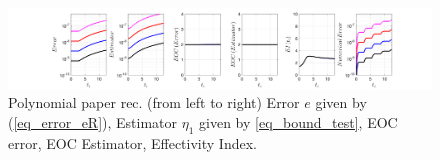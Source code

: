 \documentclass[12pt,a4paper]{article}
\numberwithin{equation}{section}
\theoremstyle{definition}
\begin{document}
\begin{figure}[H]
	\hspace{-3cm}
	\includegraphics[scale=0.55]{fig_LeapFrogplots_1x5_sin_IC_harmonic_u4_v6_paperrec_poly}	
	\caption{Polynomial paper rec. (from left to right) Error $e$ given by (\ref{eq_error_eR}), Estimator $\eta_1$ given by \ref{eq_bound_test},  EOC error, EOC Estimator, Effectivity Index.}
	\label{fig_all_in_one_paperrec_poly_u04_v06}
\end{figure}
\end{document}
